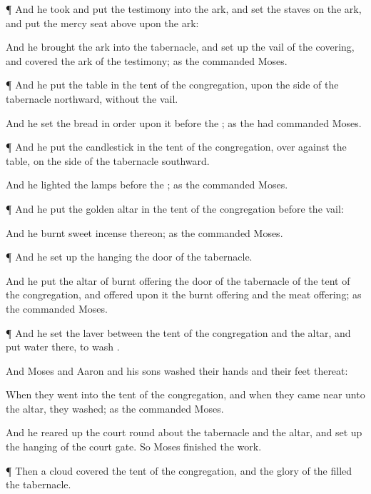 {\par }{\PP {}¶ And he
took and
put the
testimony into the
ark, and
set the
staves on the
ark, and
put the mercy
seat
above upon the
ark:

And he
brought the
ark into the
tabernacle, and set
up the
vail of the
covering, and
covered the
ark of the
testimony; as the
{}
commanded
Moses.


\par }{\PP {}¶ And he
put the
table in the
tent of the
congregation, upon the
side of the
tabernacle
northward,
without the
vail.

And he
set the
bread in
order upon it
before the
{}; as the
{} had
commanded
Moses.


\par }{\PP {}¶ And he
put the
candlestick in the
tent of the
congregation, over
against the
table, on the
side of the
tabernacle
southward.

And he
lighted the
lamps
before the
{}; as the
{}
commanded
Moses.


\par }{\PP {}¶ And he
put the
golden
altar in the
tent of the
congregation
before the
vail:

And he
burnt
sweet
incense thereon; as the
{}
commanded
Moses.


\par }{\PP {}¶ And he set
up the
hanging
{} the
door of the
tabernacle.

And he
put the
altar of burnt
offering
{} the
door of the
tabernacle of the
tent of the
congregation, and
offered upon it the burnt
offering and the meat
offering; as the
{}
commanded
Moses.


\par }{\PP {}¶ And he
set the
laver between the
tent of the
congregation and the
altar, and
put
water there, to
wash
{}.

And
Moses and
Aaron and his
sons
washed their
hands and their
feet thereat:

When they
went into the
tent of the
congregation, and when they came
near unto the
altar, they
washed; as the
{}
commanded
Moses.

And he reared
up the
court round
about the
tabernacle and the
altar, and set
up the
hanging of the
court
gate. So
Moses
finished the
work.


\par }{\PP {}¶ Then a
cloud
covered the
tent of the
congregation, and the
glory of the
{}
filled the
tabernacle.

}
